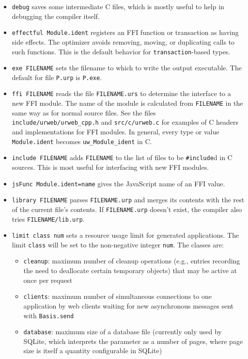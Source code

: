 \documentclass{article}
\begin{document}
\begin{itemize}
\item \texttt{debug} saves some intermediate C files, which is mostly useful to help in debugging the compiler itself.
\item \texttt{effectful Module.ident} registers an FFI function or transaction as having side effects.  The optimizer avoids removing, moving, or duplicating calls to such functions.  This is the default behavior for \texttt{transaction}-based types.
\item \texttt{exe FILENAME} sets the filename to which to write the output executable.  The default for file \texttt{P.urp} is \texttt{P.exe}.  
\item \texttt{ffi FILENAME} reads the file \texttt{FILENAME.urs} to determine the interface to a new FFI module.  The name of the module is calculated from \texttt{FILENAME} in the same way as for normal source files.  See the files \texttt{include/urweb/urweb\_cpp.h} and \texttt{src/c/urweb.c} for examples of C headers and implementations for FFI modules.  In general, every type or value \texttt{Module.ident} becomes \texttt{uw\_Module\_ident} in C.
\item \texttt{include FILENAME} adds \texttt{FILENAME} to the list of files to be \texttt{\#include}d in C sources.  This is most useful for interfacing with new FFI modules.
\item \texttt{jsFunc Module.ident=name} gives the JavaScript name of an FFI value.
\item \texttt{library FILENAME} parses \texttt{FILENAME.urp} and merges its contents with the rest of the current file's contents.  If \texttt{FILENAME.urp} doesn't exist, the compiler also tries \texttt{FILENAME/lib.urp}.
\item \texttt{limit class num} sets a resource usage limit for generated applications.  The limit \texttt{class} will be set to the non-negative integer \texttt{num}.  The classes are:
  \begin{itemize}
  \item \texttt{cleanup}: maximum number of cleanup operations (e.g., entries recording the need to deallocate certain temporary objects) that may be active at once per request
  \item \texttt{clients}: maximum number of simultaneous connections to one application by web clients waiting for new asynchronous messages sent with \texttt{Basis.send}
  \item \texttt{database}: maximum size of a database file (currently only used by SQLite, which interprets the parameter as a number of pages, where page size is itself a quantity configurable in SQLite)

\end{itemize}
\end{itemize}
\end{document}
